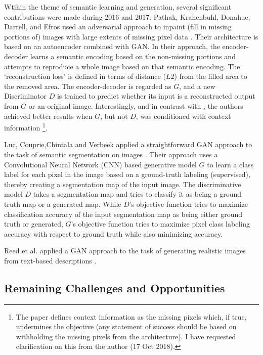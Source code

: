 \documentclass[11pt]{article}
\begin{document}
Wtihin the theme of semantic learning and generation, several significant contributions were made during 2016 and 2017.  Pathak, Krahenbuhl, Donahue, Darrell, and Efros used an adversarial approach to inpaint (fill in missing portions of) images with large extents of missing pixel data \cite{pathakCVPR16context}.  Their architecture is based on an autoencoder \cite{hinton2006reducing} combined with GAN.  In their approach, the encoder-decoder learns a semantic encoding based on the non-missing portions and attempts to reproduce a whole image based on that semantic encoding.  The `reconstruction loss' is defined in terms of distance ($L2$) from the filled area to the removed area. The encoder-decoder is regarded as $G$, and a new Discriminator $D$ is trained to predict whether its input is a reconstructed output from $G$ or an original image.  Interestingly, and in contrast with \cite{mirza2014conditional}, the authors achieved better results when $G$, but not $D$, was conditioned with context information \footnote{The paper defines context information as the missing pixels which, if true, undermines the objective (any statement of success should be based on withholding the missing pixels from the architecture).  I have requested clarification on this from the author (17 Oct 2018).}.

Luc, Couprie,Chintala and Verbeek applied a straightforward GAN approach to the task of semantic segmentation on images \cite{Luc2016SemanticSU}.  Their approach uses a Convolutional Neural Network (CNN) based generative model $G$ to learn a class label for each pixel in the image based on a ground-truth labeling (supervised), thereby creating a segmentation map of the input image.  The discriminative model $D$ takes a segmentation map and tries to classify it as being a ground truth map or a generated map.  While $D$'s objective function tries to maximize classification accuracy of the input segmentation map as being either ground truth or generated, $G$'s objective function tries to maximize pixel class labeling accuracy with respect to ground truth while also minimizing accuracy.

Reed et al. applied a GAN approach to the task of generating realistic images from text-based descriptions \cite{reed2016generative}.


\subsection{Remaining Challenges and Opportunities}
\end{document}

